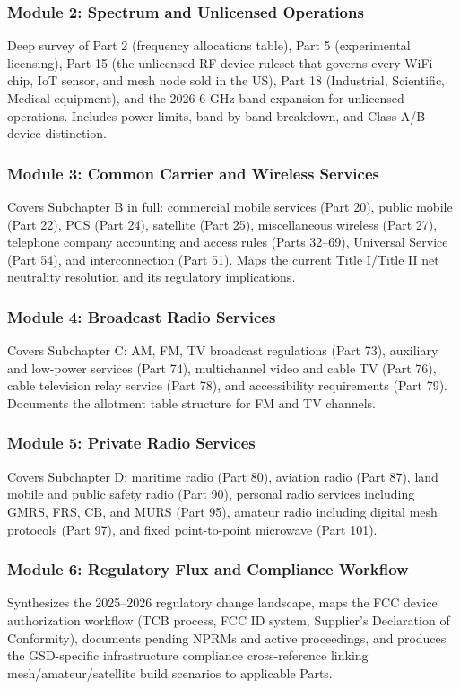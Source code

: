 \documentclass[11pt,letterpaper]{article}
\begin{document}
\subsubsection{Module 2: Spectrum and Unlicensed Operations}
Deep survey of Part 2 (frequency allocations table), Part 5 (experimental licensing), Part 15 (the unlicensed RF device ruleset that governs every WiFi chip, IoT sensor, and mesh node sold in the US), Part 18 (Industrial, Scientific, Medical equipment), and the 2026 6 GHz band expansion for unlicensed operations. Includes power limits, band-by-band breakdown, and Class A/B device distinction.

\subsubsection{Module 3: Common Carrier and Wireless Services}
Covers Subchapter B in full: commercial mobile services (Part 20), public mobile (Part 22), PCS (Part 24), satellite (Part 25), miscellaneous wireless (Part 27), telephone company accounting and access rules (Parts 32--69), Universal Service (Part 54), and interconnection (Part 51). Maps the current Title I/Title II net neutrality resolution and its regulatory implications.

\subsubsection{Module 4: Broadcast Radio Services}
Covers Subchapter C: AM, FM, TV broadcast regulations (Part 73), auxiliary and low-power services (Part 74), multichannel video and cable TV (Part 76), cable television relay service (Part 78), and accessibility requirements (Part 79). Documents the allotment table structure for FM and TV channels.

\subsubsection{Module 5: Private Radio Services}
Covers Subchapter D: maritime radio (Part 80), aviation radio (Part 87), land mobile and public safety radio (Part 90), personal radio services including GMRS, FRS, CB, and MURS (Part 95), amateur radio including digital mesh protocols (Part 97), and fixed point-to-point microwave (Part 101).

\subsubsection{Module 6: Regulatory Flux and Compliance Workflow}
Synthesizes the 2025--2026 regulatory change landscape, maps the FCC device authorization workflow (TCB process, FCC ID system, Supplier's Declaration of Conformity), documents pending NPRMs and active proceedings, and produces the GSD-specific infrastructure compliance cross-reference linking mesh/amateur/satellite build scenarios to applicable Parts.
\end{document}
